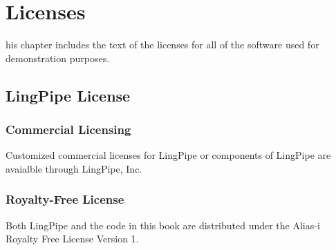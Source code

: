 \chapter{Licenses}
\newlength{\oldbaselineskip}
\setlength{\oldbaselineskip}{\baselineskip}

\noindent
{}his chapter includes the text of the licenses for all of
the software used for demonstration purposes.

\section{LingPipe License}

\subsection{Commercial Licensing}

\noindent
Customized commercial licenses for LingPipe or components of LingPipe
are avaialble through LingPipe, Inc.

\subsection{Royalty-Free License}

\noindent
Both LingPipe and the code in this book are distributed under
the Alias-i Royalty Free License Version 1.
\\[2pt]

